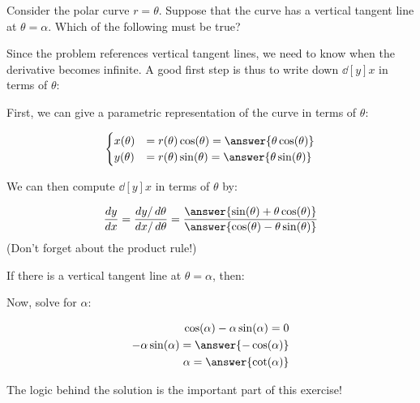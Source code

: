 \documentclass{ximera}
\author{Jim Talamo}
\begin{document}
\begin{exercise}
Consider the polar curve $r = \theta$.  Suppose that the curve has a vertical tangent line at $\theta = \alpha$.  Which of the following must be true?

\begin{multipleChoice}
\choice{$\alpha = \cos{\alpha}$}
\choice{$\alpha = -\cos{\alpha}$}
\choice{$\alpha = \sin{\alpha}$}
\choice{$\alpha = -\sin{\alpha}$}
\choice{$\alpha = \tan{\alpha}$}
\choice{$\alpha = -\tan{\alpha}$}
\choice[correct]{$\alpha = \cot{\alpha}$}
\choice{$\alpha = -\cot{\alpha}$}
\end{multipleChoice}

\begin{hint}
Since the problem references vertical tangent lines, we need to know when the derivative becomes infinite.  A good first step is thus to write down $\dd[y]{x}$ in terms of $\theta$:

First, we can give a parametric representation of the curve in terms of $\theta$:

\[
\begin{cases}
x(\theta) &= r(\theta) \cos(\theta) = \answer{\theta \cos(\theta)}\\
y(\theta) &= r(\theta) \sin(\theta) = \answer{\theta \sin(\theta)}
\end{cases}
\]

We can then compute $\dd[y]{x}$ in terms of $\theta$ by:

\[
\dd[y]{x} = \frac{dy / \d \theta}{dx / \d \theta} = \frac{ \answer{\sin(\theta) + \theta \cos(\theta)} }{ \answer{\cos(\theta) - \theta \sin(\theta)} }
\]
(Don't forget about the product rule!)

\begin{question}
If there is a vertical tangent line at $\theta = \alpha$, then:

\begin{multipleChoice}
\end{multipleChoice}
\end{question}

Now, solve for $\alpha$:

\begin{align*}
\cos(\alpha) - \alpha \sin(\alpha)=0 \\
 - \alpha \sin(\alpha)=\answer{-\cos(\alpha)}\\
\alpha = \answer{\cot(\alpha)}
\end{align*}
\end{hint}

The logic behind the solution is the important part of this exercise!

\end{exercise}
\end{document}
